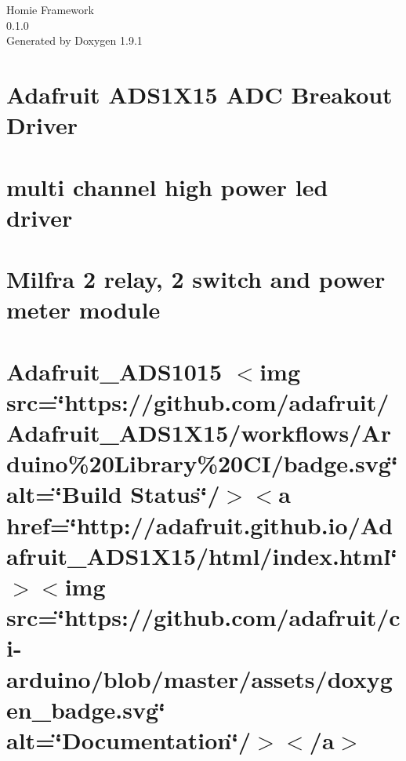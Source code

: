 \let\mypdfximage\pdfximage\def\pdfximage{\immediate\mypdfximage}\documentclass[twoside]{book}
\newcommand{\+}{\discretionary{\mbox{\scriptsize$\hookleftarrow$}}{}{}}
\newcommand{\clearemptydoublepage}{%
  \newpage{\pagestyle{empty}\cleardoublepage}%
}
\begin{document}
\raggedbottom

\hypersetup{pageanchor=false,
             bookmarksnumbered=true,
             pdfencoding=unicode
            }
\begin{titlepage}
\vspace*{7cm}
\begin{center}%
{\Large Homie Framework \\[1ex]\large 0.\+1.\+0 }\\
\vspace*{1cm}
{\large Generated by Doxygen 1.9.1}\\
\end{center}
\end{titlepage}
\clearemptydoublepage
{}
\tableofcontents
\clearemptydoublepage
{}
\hypersetup{pageanchor=true}

\chapter{Adafruit ADS1\+X15 ADC Breakout Driver}
\label{index}\hypertarget{index}{}
\chapter{multi channel high power led driver}
\label{md_documentation_devices__l_e_d_6ch10_w_readme}

\chapter{Milfra 2 relay, 2 switch and power meter module}
\label{md_documentation_devices__milfare_2__relay__h_l_w8012_readme}

\chapter{Adafruit\+\_\+\+ADS1015 $<$img src=\char`\"{}https\+://github.\+com/adafruit/\+Adafruit\+\_\+\+ADS1\+X15/workflows/\+Arduino\%20\+Library\%20\+CI/badge.\+svg\char`\"{} alt=\char`\"{}\+Build Status\char`\"{}/$>$$<$a href=\char`\"{}http\+://adafruit.\+github.\+io/\+Adafruit\+\_\+\+ADS1\+X15/html/index.\+html\char`\"{}$>$$<$img src=\char`\"{}https\+://github.\+com/adafruit/ci-\/arduino/blob/master/assets/doxygen\+\_\+badge.\+svg\char`\"{} alt=\char`\"{}\+Documentation\char`\"{}/$>$$<$/a$>$}
\label{md_lib_4_m_b__adafruit__a_d_s1_x15__r_e_a_d_m_e}

\end{document}
